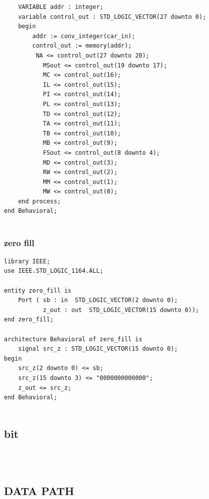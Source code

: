 \documentclass{article}
\begin{document}
\begin{lstlisting}
	VARIABLE addr : integer;
	variable control_out : STD_LOGIC_VECTOR(27 downto 0);
	begin 
		addr := conv_integer(car_in);
		control_out := memory(addr);
		 NA <= control_out(27 downto 20); 
           MSout <= control_out(19 downto 17);
           MC <= control_out(16);
           IL <= control_out(15);
           PI <= control_out(14);
           PL <= control_out(13);
           TD <= control_out(12);
           TA <= control_out(11);
           TB <= control_out(10);
           MB <= control_out(9);
           FSout <= control_out(8 downto 4);
           MD <= control_out(3);
           RW <= control_out(2);
           MM <= control_out(1);
           MW <= control_out(0);
	end process;
end Behavioral;
   
\end{lstlisting}
\pagebreak


\subsubsection{zero fill}\label{sec:intro}
\begin{lstlisting}
library IEEE;
use IEEE.STD_LOGIC_1164.ALL;

entity zero_fill is
    Port ( sb : in  STD_LOGIC_VECTOR(2 downto 0);
           z_out : out  STD_LOGIC_VECTOR(15 downto 0));
end zero_fill;

architecture Behavioral of zero_fill is
	signal src_z : STD_LOGIC_VECTOR(15 downto 0);
begin
	src_z(2 downto 0) <= sb;
	src_z(15 downto 3) <= "0000000000000";
	z_out <= src_z;
end Behavioral;
   
\end{lstlisting}
\pagebreak

\subsection{bit}\label{sec:intro}
\begin{lstlisting}

   
\end{lstlisting}
\pagebreak







\subsection{DATA PATH}\label{sec:intro}
\end{document}
